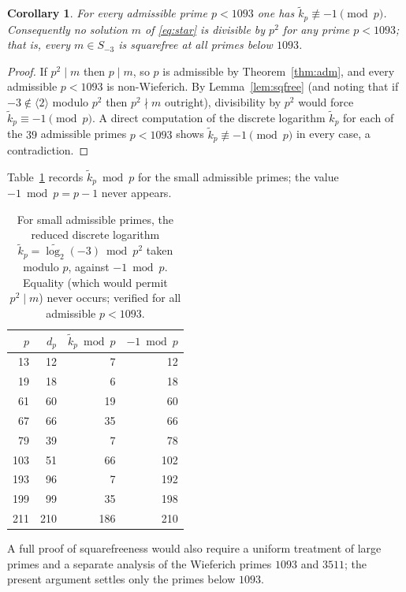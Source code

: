 \documentclass[11pt,reqno]{amsart}
\theoremstyle{plain}
\newtheorem{corollary}{Corollary}
\theoremstyle{definition}
\theoremstyle{remark}
\newcommand{\gen}[1]{\langle #1 \rangle}
\begin{document}
\begin{corollary}\label{cor:sqfree}
For every admissible prime $p<1093$ one has $\widetilde{k}_{p}\not\equiv-1\pmod p$. Consequently
no solution $m$ of \eqref{eq:star} is divisible by $p^{2}$ for any prime $p<1093$; that is, every
$m\in S_{-3}$ is squarefree at all primes below $1093$.
\end{corollary}

\begin{proof}
If $p^{2}\mid m$ then $p\mid m$, so $p$ is admissible by Theorem~\ref{thm:adm}, and every
admissible $p<1093$ is non-Wieferich. By Lemma~\ref{lem:sqfree} (and noting that if $-3\notin
\gen{2}$ modulo $p^{2}$ then $p^{2}\nmid m$ outright), divisibility by $p^{2}$ would force
$\widetilde{k}_{p}\equiv-1\pmod p$. A direct computation of the discrete logarithm
$\widetilde{k}_{p}$ for each of the $39$ admissible primes $p<1093$ shows
$\widetilde{k}_{p}\not\equiv-1\pmod p$ in every case, a contradiction.
\end{proof}

Table~\ref{tab:sqfree} records $\widetilde{k}_{p}\bmod p$ for the small admissible primes; the
value $-1\bmod p=p-1$ never appears.

\begin{table}[t]
\centering
\small
\begin{tabular}{rrrr}
\toprule
$p$ & $d_{p}$ & $\widetilde{k}_{p}\bmod p$ & $-1\bmod p$ \\
\midrule
13  & 12  & 7   & 12  \\
19  & 18  & 6   & 18  \\
61  & 60  & 19  & 60  \\
67  & 66  & 35  & 66  \\
79  & 39  & 7   & 78  \\
103 & 51  & 66  & 102 \\
193 & 96  & 7   & 192 \\
199 & 99  & 35  & 198 \\
211 & 210 & 186 & 210 \\
\bottomrule
\end{tabular}
\caption{For small admissible primes, the reduced discrete logarithm
$\widetilde{k}_{p}=\widetilde{\log_{2}}(-3)\bmod p^{2}$ taken modulo $p$, against $-1\bmod p$.
Equality (which would permit $p^{2}\mid m$) never occurs; verified for all admissible $p<1093$.}
\label{tab:sqfree}
\end{table}

A full proof of squarefreeness would also require a uniform treatment of large primes and a
separate analysis of the Wieferich primes $1093$ and $3511$; the present argument settles only
the primes below $1093$.
\end{document}
